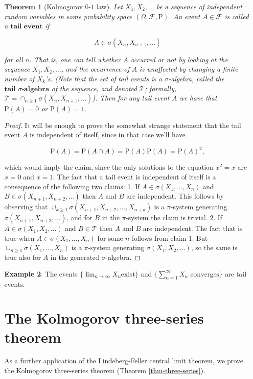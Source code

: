 \documentclass[11pt]{report}
\theoremstyle{plain}
\newtheorem{thm}{Theorem}[chapter]
\theoremstyle{definition}
\newtheorem{example}[thm]{Example}
\begin{document}
\begin{thm}[Kolmogorov $0$-$1$ law]
Let $X_1,X_2,\ldots$ be a sequence of independent
random variables in some probability space
$(\Omega, \mathcal{F}, \mathrm{P})$. An event
$A\in \mathcal{F}$ is called a $\textbf{tail event}$
if

\[
A \in \sigma(X_n, X_{n+1}, \ldots)
\]

for all $n$. That is, one can tell whether $A$
occurred or not by looking at the sequence
$X_1,X_2,\ldots$, and the occurrence of $A$ is
unaffected by changing a finite number of $X_k$'s.
(Note that the set of tail events is a
$\sigma$-algebra, called the
$\textbf{tail } \sigma\textbf{-algebra}$ of the
sequence, and denoted $\mathcal{T}$; formally,
$\mathcal{T}=\cap_{n\ge 1}\sigma(X_n,X_{n+1},\ldots)$).
Then for any tail event $A$ we have that
$\mathrm{P}(A) = 0$ or $\mathrm{P}(A)=1$.
\end{thm}

\begin{proof}
It will be enough to prove the somewhat strange
statement that the tail event $A$ is independent of
itself, since in that case we'll have

\[
\mathrm{P}(A) = \mathrm{P}(A\cap A) = \mathrm{P}(A)\mathrm{P}(A) = \mathrm{P}(A)^2,
\]

which would imply the claim, since the only
solutions to the equation $x^2=x$ are $x=0$ and $x=1$.
The fact that a tail event is independent of itself is
a consequence of the following two claims: 1. If
$A \in \sigma(X_1,\ldots,X_n)$ and
$B\in \sigma(X_{n+1},X_{n+2},\ldots)$ then $A$ and $B$
are independent. This follows by observing that
$\cup_{k\ge1} \sigma(X_{n+1},X_{n+2},\ldots,X_{n+k})$
is a $\pi$-system generating
$\sigma(X_{n+1},X_{n+2},\ldots)$, and for $B$ in the
$\pi$-system the claim is trivial. 2. If
$A\in\sigma(X_1,X_2,\ldots)$ and $B\in\mathcal{T}$
then $A$ and $B$ are independent. The fact that is
true when $A\in \sigma(X_1,\ldots,X_n)$ for some $n$
follows from claim 1. But
$\cup_{n\ge 1} \sigma(X_1,\ldots,X_n)$ is a
$\pi$-system generating $\sigma(X_1,X_2,\ldots)$, so
the same is true also for $A$ in the generated
$\sigma$-algebra.
\end{proof}

\begin{example}
The events
$\{ \displaystyle \lim_{n\to\infty} X_n\textrm{
exist} \}$
and $\{ \sum_{n=1}^\infty X_n \textrm{ converges} \}$
are tail events.
\end{example}

\section{The Kolmogorov three-series theorem}
\label{sec-k-3-series}
As a further application of the Lindeberg-Feller
central limit theorem, we prove the Kolmogorov
three-series theorem (Theorem \ref{thm-three-series}).
\end{document}

